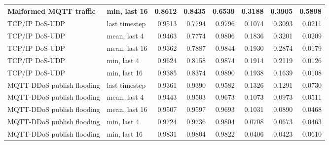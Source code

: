 \begin{table}[!htbp]
{\begin{tabular}{llrrrrrr}
Malformed MQTT traffic & min, last 16 & 0.8612 & 0.8435 & 0.6539 & 0.3188 & 0.3905 & 0.5898 \\
\midrule
TCP/IP DoS-UDP & last timestep & 0.9513 & 0.7794 & 0.9796 & 0.1074 & 0.3093 & 0.0211 \\
TCP/IP DoS-UDP & mean, last 4 & 0.9463 & 0.7774 & 0.9806 & 0.1836 & 0.3201 & 0.0209 \\
TCP/IP DoS-UDP & mean, last 16 & 0.9362 & 0.7887 & 0.9844 & 0.1930 & 0.2874 & 0.0179 \\
TCP/IP DoS-UDP & min, last 4 & 0.9624 & 0.8158 & 0.9874 & 0.1914 & 0.2119 & 0.0126 \\
TCP/IP DoS-UDP & min, last 16 & 0.9385 & 0.8374 & 0.9890 & 0.1938 & 0.1639 & 0.0108 \\
\midrule
MQTT-DDoS publish flooding & last timestep & 0.9361 & 0.9390 & 0.9582 & 0.1326 & 0.1291 & 0.0730 \\
MQTT-DDoS publish flooding & mean, last 4 & 0.9443 & 0.9503 & 0.9673 & 0.1073 & 0.0973 & 0.0511 \\
MQTT-DDoS publish flooding & mean, last 16 & 0.9507 & 0.9597 & 0.9693 & 0.1031 & 0.0890 & 0.0468 \\
MQTT-DDoS publish flooding & min, last 4 & 0.9724 & 0.9736 & 0.9804 & 0.0708 & 0.0673 & 0.0463 \\
MQTT-DDoS publish flooding & min, last 16 & 0.9831 & 0.9804 & 0.9822 & 0.0406 & 0.0423 & 0.0610 \\
\bottomrule
\end{tabular}
}
\end{table}
